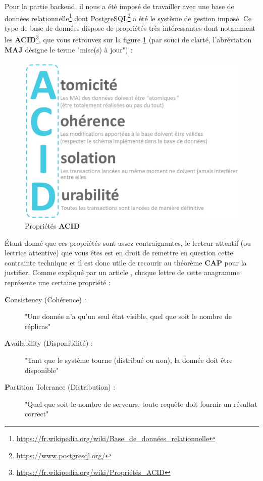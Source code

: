 Pour la partie \gls{backend}, il nous a été imposé de travailler avec une base de données relationnelle\footnote{
    \href{https://fr.wikipedia.org/wiki/Base\_de\_donn\%C3\%A9es\_relationnelle}
    {https://fr.wikipedia.org/wiki/Base\_de\_données\_relationnelle}
} dont PostgreSQL\footnote{
    \url{https://www.postgresql.org/}
} a été le système de gestion imposé. Ce type de base de données dispose de propriétés très intéressantes dont notamment les \textbf{ACID}\footnote{
    \href{https://fr.wikipedia.org/wiki/Propri\%C3\%A9t\%C3\%A9s\_ACID}
    {https://fr.wikipedia.org/wiki/Propriétés\_ACID}
}, que vous retrouvez sur la figure \ref{pic:ACIDproperties} (par souci de clarté, l'abréviation \textbf{MAJ} désigne le terme "mise(s) à jour") :

\begin{figure}[H]
    \includegraphics[width=\textwidth,height=\textheight,keepaspectratio]{images/ACID.png}
    \centering
    \caption[Propriétés \textbf{ACID}]{Propriétés \textbf{ACID} \cite{bigdata_cap}}
    \label{pic:ACIDproperties}
\end{figure}

\pagebreak

Étant donné que ces propriétés sont assez contraignantes, le lecteur attentif (ou lectrice attentive) que vous êtes est en droit de remettre en question cette contrainte technique et il est donc utile de recourir au théorème \textbf{CAP} pour la justifier.
Comme expliqué par un article \cite{acid_cap}, chaque lettre de cette anagramme représente une certaine propriété :
\begin{description}
    \item[\textbf{C}onsistency (Cohérence) :] "Une donnée n'a qu'un seul état visible, quel que soit le nombre de réplicas"
    \item[\textbf{A}vailability (Disponibilité) :] "Tant que le système tourne (distribué ou non), la donnée doit être disponible"
    \item[\textbf{P}artition Tolerance (Distribution) :] "Quel que soit le nombre de serveurs, toute requête doit fournir un résultat correct" 
\end{description}


